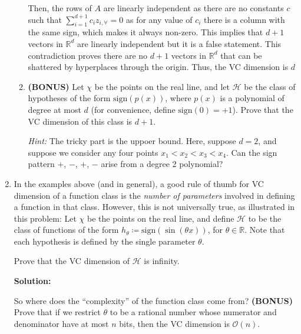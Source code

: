 \documentclass[12pt]{article}
\newcommand{\sign}[1]{\text{sign}(#1)}
\newcommand{\BigO}[1]{\mathcal{O}\left( #1 \right)}
\begin{document}
\begin{enumerate}
\begin{enumerate}
Then, the rows of $A$ are linearly independent as there are no constants $c$ such that $\sum_{i=1}^{d+1}c_{i}z_{i,\forall} = 0$ as for any value of $c_{i}$ there is a column with the same sign, which makes it always non-zero. This implies that $d+1$ vectors in $\mathbb{R}^{d}$ are linearly independent but it is a false statement. This contradiction proves there are no $d+1$ vectors in $\mathbb{R}^{d}$ that can be shattered by hyperplaces through the origin. Thus, the VC dimension is $d$

\item {\bf (BONUS)} Let $\chi$ be the points on the real line, and let $\mathcal{H}$ be the class of hypotheses of the form $\sign{p(x)}$, where $p(x)$ is a polynomial of degree at most $d$ (for convenience, define $\sign{0} = +1$). Prove that the VC dimension of this class is $d+1$. 

{\em Hint:} The tricky part is the uppoer bound. Here, suppose $d = 2$, and suppose we consider any four points $x_{1} < x_{2} < x_{3} < x_{4}$. Can the sign pattern $+$, $-$, $+$, $-$ arise from a degree 2 polynomial?
\end{enumerate}

\item In the examples above (and in general), a good rule of thumb for VC dimension of a function class is the {\em number of parameters} involved in defining a function in that class. However, this is not universally true, as illustrated in this problem: Let $\chi$ be the points on the real line, and define $\mathcal{H}$ to be the class of functions of the form $h_{\theta} \coloneqq \sign{\sin(\theta x)}$, for $\theta \in \mathbb{R}$. Note that each hypothesis is defined by the single parameter $\theta$.

Prove that the VC dimension of $\mathcal{H}$ is infinity.

{\bf Solution:}

So where does the ``complexity'' of the function class come from? {\bf (BONUS)} Prove that if we restrict $\theta$ to be a rational number whose numerator and denominator have at most $n$ bits, then the VC dimension is $\BigO{n}$.
\end{enumerate}
 
\end{document}
